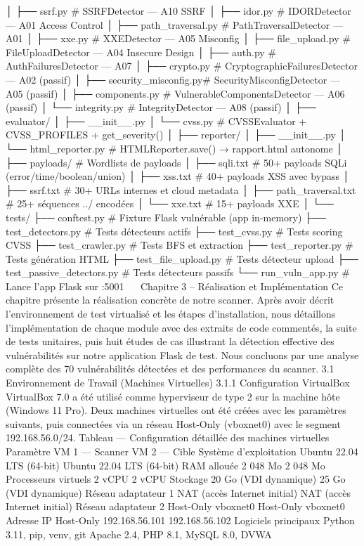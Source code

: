 │   ├── ssrf.py              # SSRFDetector  — A10 SSRF
│   ├── idor.py              # IDORDetector  — A01 Access Control
│   ├── path_traversal.py    # PathTraversalDetector — A01
│   ├── xxe.py               # XXEDetector   — A05 Misconfig
│   ├── file_upload.py       # FileUploadDetector — A04 Insecure Design
│   ├── auth.py              # AuthFailuresDetector — A07
│   ├── crypto.py            # CryptographicFailuresDetector — A02 (passif)
│   ├── security_misconfig.py# SecurityMisconfigDetector — A05 (passif)
│   ├── components.py        # VulnerableComponentsDetector — A06 (passif)
│   └── integrity.py         # IntegrityDetector — A08 (passif)
│
├── evaluator/
│   ├── __init__.py
│   └── cvss.py              # CVSSEvaluator + CVSS_PROFILES + get_severity()
│
├── reporter/
│   ├── __init__.py
│   └── html_reporter.py     # HTMLReporter.save() → rapport.html autonome
│
├── payloads/                # Wordlists de payloads
│   ├── sqli.txt             # 50+ payloads SQLi (error/time/boolean/union)
│   ├── xss.txt              # 40+ payloads XSS avec bypass
│   ├── ssrf.txt             # 30+ URLs internes et cloud metadata
│   ├── path_traversal.txt   # 25+ séquences ../ encodées
│   └── xxe.txt              # 15+ payloads XXE
│
└── tests/
    ├── conftest.py          # Fixture Flask vulnérable (app in-memory)
    ├── test_detectors.py    # Tests détecteurs actifs
    ├── test_cvss.py         # Tests scoring CVSS
    ├── test_crawler.py      # Tests BFS et extraction
    ├── test_reporter.py     # Tests génération HTML
    ├── test_file_upload.py  # Tests détecteur upload
    ├── test_passive_detectors.py  # Tests détecteurs passifs
    └── run_vuln_app.py      # Lance l'app Flask sur :5001
 
Chapitre 3 – Réalisation et Implémentation
Ce chapitre présente la réalisation concrète de notre scanner. Après avoir décrit l'environnement de test virtualisé et les étapes d'installation, nous détaillons l'implémentation de chaque module avec des extraits de code commentés, la suite de tests unitaires, puis huit études de cas illustrant la détection effective des vulnérabilités sur notre application Flask de test. Nous concluons par une analyse complète des 70 vulnérabilités détectées et des performances du scanner.
3.1  Environnement de Travail (Machines Virtuelles)
3.1.1  Configuration VirtualBox
VirtualBox 7.0 a été utilisé comme hyperviseur de type 2 sur la machine hôte (Windows 11 Pro). Deux machines virtuelles ont été créées avec les paramètres suivants, puis connectées via un réseau Host-Only (vboxnet0) avec le segment 192.168.56.0/24.
Tableau — Configuration détaillée des machines virtuelles
Paramètre	VM 1 — Scanner	VM 2 — Cible
Système d'exploitation	Ubuntu 22.04 LTS (64-bit)	Ubuntu 22.04 LTS (64-bit)
RAM allouée	2 048 Mo	2 048 Mo
Processeurs virtuels	2 vCPU	2 vCPU
Stockage	20 Go (VDI dynamique)	25 Go (VDI dynamique)
Réseau adaptateur 1	NAT (accès Internet initial)	NAT (accès Internet initial)
Réseau adaptateur 2	Host-Only vboxnet0	Host-Only vboxnet0
Adresse IP Host-Only	192.168.56.101	192.168.56.102
Logiciels principaux	Python 3.11, pip, venv, git	Apache 2.4, PHP 8.1, MySQL 8.0, DVWA

